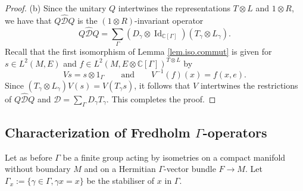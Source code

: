 \documentclass[11pt,a4paper]{amsart}
\newcommand{\C}{\mathbb C}
\newcommand{\maD}{\mathcal D}
\newcommand\<{\langle}
\renewcommand\>{\rangle}
\newcommand{\oid}{\operatorname{Id}}
\theoremstyle{definition}
\begin{document}
\begin{proof}
(b) Since the unitary $Q$ intertwines the representations $T\otimes L$ and $1 \otimes R$, we have that
$Q\hat{\maD}Q$ is the $(1 \otimes R)$-invariant operator
\begin{equation*}
Q\hat{\maD}Q =  \sum_\Gamma (D_\gamma \otimes \oid_{\C[\Gamma]})(T_\gamma \otimes L_\gamma).
\end{equation*} 
Recall that the first isomorphism of Lemma \ref{lem.iso.commut} is given for 
$s \in L^2(M,E)$ and $f\in L^2(M, E \otimes \C[\Gamma])^{T \otimes L}$ by 
\begin{equation*}
Vs= s \otimes 1_\Gamma \qquad  \text{and} \qquad V^{-1}(f)(x)=f(x,e).
\end{equation*}
Since $(T_\gamma \otimes L_\gamma) V(s)=V(T_\gamma s)$, 
it follows that $V$ intertwines the restrictions of $Q \hat{\maD}Q$ and 
$\maD = \sum_\Gamma D_\gamma T_\gamma$. This completes the proof.
\end{proof}


\subsection*{Characterization of Fredholm $\Gamma$-operators}

Let as before $\Gamma$ be a finite group acting by isometries on a compact manifold without boundary $M$  and on a Hermitian $\Gamma$-vector bundle $F \rightarrow M$.
Let $\Gamma_x:=\{\gamma \in \Gamma , \gamma x=x\}$ be the stabiliser of $x$ in $\Gamma$.
\end{document}
